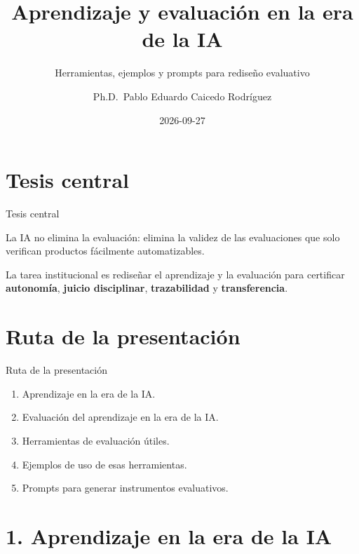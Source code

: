 \documentclass[
  ignorenonframetext,
  aspectratio=169,
  spanish,
]{beamer}
\title{\texorpdfstring{Aprendizaje y evaluación en la era de la
IA}{Aprendizaje y evaluación en la era de la IA}}
\subtitle{\texorpdfstring{Herramientas, ejemplos y prompts para rediseño
evaluativo}{Herramientas, ejemplos y prompts para rediseño evaluativo}}
\author{Ph.D.~Pablo Eduardo Caicedo Rodríguez}
\date{2026-09-27}
\providecommand{\tightlist}{%
  \setlength{\itemsep}{0pt}\setlength{\parskip}{0pt}}
\begin{document}
\frame{\titlepage}


\section{Tesis central}\label{tesis-central}

\begin{frame}{Tesis central}
\begin{tcolorbox}[enhanced jigsaw, arc=.35mm, bottomrule=.15mm, breakable, colback=white, colframe=quarto-callout-color-frame, left=2mm, leftrule=.75mm, opacityback=0, rightrule=.15mm, toprule=.15mm]

La IA no elimina la evaluación: elimina la validez de las evaluaciones
que solo verifican productos fácilmente automatizables.

\end{tcolorbox}

La tarea institucional es rediseñar el aprendizaje y la evaluación para
certificar \textbf{autonomía}, \textbf{juicio disciplinar},
\textbf{trazabilidad} y \textbf{transferencia}.
\end{frame}

\section{Ruta de la presentación}\label{ruta-de-la-presentaciuxf3n}

\begin{frame}{Ruta de la presentación}
\begin{enumerate}
\tightlist
\item
  Aprendizaje en la era de la IA.
\item
  Evaluación del aprendizaje en la era de la IA.
\item
  Herramientas de evaluación útiles.
\item
  Ejemplos de uso de esas herramientas.
\item
  Prompts para generar instrumentos evaluativos.
\end{enumerate}
\end{frame}

\section{1. Aprendizaje en la era de la
IA}\label{aprendizaje-en-la-era-de-la-ia}
\end{document}
